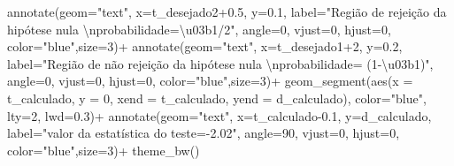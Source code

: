 \documentclass[
]{book}
\newenvironment{Shaded}{\begin{snugshade}}{\end{snugshade}}
\newcommand{\AttributeTok}[1]{\textcolor[rgb]{0.77,0.63,0.00}{#1}}
\newcommand{\DecValTok}[1]{\textcolor[rgb]{0.00,0.00,0.81}{#1}}
\newcommand{\FloatTok}[1]{\textcolor[rgb]{0.00,0.00,0.81}{#1}}
\newcommand{\FunctionTok}[1]{\textcolor[rgb]{0.00,0.00,0.00}{#1}}
\newcommand{\NormalTok}[1]{#1}
\newcommand{\SpecialCharTok}[1]{\textcolor[rgb]{0.00,0.00,0.00}{#1}}
\newcommand{\StringTok}[1]{\textcolor[rgb]{0.31,0.60,0.02}{#1}}
\begin{document}
\begin{Shaded}
\begin{Highlighting}[]
 \FunctionTok{annotate}\NormalTok{(}\AttributeTok{geom=}\StringTok{"text"}\NormalTok{, }\AttributeTok{x=}\NormalTok{t\_desejado2}\FloatTok{+0.5}\NormalTok{, }\AttributeTok{y=}\FloatTok{0.1}\NormalTok{, }\AttributeTok{label=}\StringTok{"Região de rejeição da hipótese nula }\SpecialCharTok{\textbackslash{}n}\StringTok{probabilidade=\textbackslash{}u03b1/2"}\NormalTok{, }\AttributeTok{angle=}\DecValTok{0}\NormalTok{, }\AttributeTok{vjust=}\DecValTok{0}\NormalTok{, }\AttributeTok{hjust=}\DecValTok{0}\NormalTok{, }\AttributeTok{color=}\StringTok{"blue"}\NormalTok{,}\AttributeTok{size=}\DecValTok{3}\NormalTok{)}\SpecialCharTok{+}
 \FunctionTok{annotate}\NormalTok{(}\AttributeTok{geom=}\StringTok{"text"}\NormalTok{, }\AttributeTok{x=}\NormalTok{t\_desejado1}\SpecialCharTok{+}\DecValTok{2}\NormalTok{, }\AttributeTok{y=}\FloatTok{0.2}\NormalTok{, }\AttributeTok{label=}\StringTok{"Região de não rejeição da hipótese nula }\SpecialCharTok{\textbackslash{}n}\StringTok{probabilidade= (1{-}\textbackslash{}u03b1)"}\NormalTok{, }\AttributeTok{angle=}\DecValTok{0}\NormalTok{, }\AttributeTok{vjust=}\DecValTok{0}\NormalTok{, }\AttributeTok{hjust=}\DecValTok{0}\NormalTok{, }\AttributeTok{color=}\StringTok{"blue"}\NormalTok{,}\AttributeTok{size=}\DecValTok{3}\NormalTok{)}\SpecialCharTok{+}
 \FunctionTok{geom\_segment}\NormalTok{(}\FunctionTok{aes}\NormalTok{(}\AttributeTok{x =}\NormalTok{ t\_calculado, }\AttributeTok{y =} \DecValTok{0}\NormalTok{, }\AttributeTok{xend =}\NormalTok{ t\_calculado, }\AttributeTok{yend =}\NormalTok{ d\_calculado), }\AttributeTok{color=}\StringTok{"blue"}\NormalTok{, }\AttributeTok{lty=}\DecValTok{2}\NormalTok{, }\AttributeTok{lwd=}\FloatTok{0.3}\NormalTok{)}\SpecialCharTok{+}
 \FunctionTok{annotate}\NormalTok{(}\AttributeTok{geom=}\StringTok{"text"}\NormalTok{, }\AttributeTok{x=}\NormalTok{t\_calculado}\FloatTok{{-}0.1}\NormalTok{, }\AttributeTok{y=}\NormalTok{d\_calculado, }\AttributeTok{label=}\StringTok{"valor da estatística do teste={-}2.02"}\NormalTok{, }\AttributeTok{angle=}\DecValTok{90}\NormalTok{, }\AttributeTok{vjust=}\DecValTok{0}\NormalTok{, }\AttributeTok{hjust=}\DecValTok{0}\NormalTok{, }\AttributeTok{color=}\StringTok{"blue"}\NormalTok{,}\AttributeTok{size=}\DecValTok{3}\NormalTok{)}\SpecialCharTok{+}
  \FunctionTok{theme\_bw}\NormalTok{()}
\end{Highlighting}
\end{Shaded}
\end{document}
